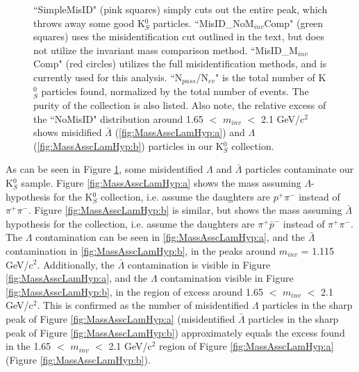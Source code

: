 \documentclass[../AnalysisNoteJBuxton.tex]{subfiles}
\begin{document}
\begin{figure}[h!]
{  ``SimpleMisID" (pink squares) simply cuts out the entire peak, which throws away some good K$^{0}_{S}$ particles.
  ``MisID\_NoM$_{inv}$Comp" (green squares) uses the misidentification cut outlined in the text, but does not utilize the invariant mass comparison method.
  ``MisID\_M$_{inv}$Comp" (red circles) utilizes the full misidentification methods, and is currently used for this analysis.
  ``N$_{pass}$/N$_{ev}$" is the total number of K$^{0}_{S}$ particles found, normalized by the total number of events.  The purity of the collection is also listed. 
  Also note, the relative excess of the ``NoMisID" distribution around 1.65 $<$ $m_{inv}$ $<$ 2.1 GeV/c$^{2}$ shows misidified $\bar{\Lambda}$ (\ref{fig:MassAsscLamHyp:a}) and $\Lambda$ (\ref{fig:MassAsscLamHyp:b}) particles in our K$^{0}_{S}$ collection.}
  \label{fig:MassAsscLamHyp}
\end{figure}



As can be seen in Figure \ref{fig:MassAsscLamHyp}, some misidentified $\Lambda$ and $\bar{\Lambda}$ particles contaminate our K$^{0}_{S}$ sample.
Figure \ref{fig:MassAsscLamHyp:a} shows the mass assuming $\Lambda$-hypothesis for the K$^{0}_{S}$ collection, i.e. assume the daughters are $p^{+}\pi^{-}$ instead of $\pi^{+}\pi^{-}$.
Figure \ref{fig:MassAsscLamHyp:b} is similar, but shows the mass assuming $\bar{\Lambda}$ hypothesis for the collection, i.e. assume the daughters are $\pi^{+}\bar{p}^{-}$ instead of $\pi^{+}\pi^{-}$.
The $\Lambda$ contamination can be seen in \ref{fig:MassAsscLamHyp:a}, and the $\bar{\Lambda}$ contamination in \ref{fig:MassAsscLamHyp:b}, in the peaks around $m_{inv}$ = 1.115 GeV/c$^{2}$.
Additionally, the $\bar{\Lambda}$ contamination is visible in Figure \ref{fig:MassAsscLamHyp:a}, and the $\Lambda$ contamination visible in Figure \ref{fig:MassAsscLamHyp:b}, in the region of excess around 1.65 $<$ $m_{inv}$ $<$ 2.1 GeV/c$^{2}$.
This is confirmed as the number of misidentified $\Lambda$ particles in the sharp peak of Figure \ref{fig:MassAsscLamHyp:a} (misidentified $\bar{\Lambda}$ particles in the sharp peak of Figure \ref{fig:MassAsscLamHyp:b}) approximately equals the excess found in the 1.65 $<$ $m_{inv}$ $<$ 2.1 GeV/c$^{2}$ region of Figure \ref{fig:MassAsscLamHyp:a} (Figure \ref{fig:MassAsscLamHyp:b}).
\end{document}
